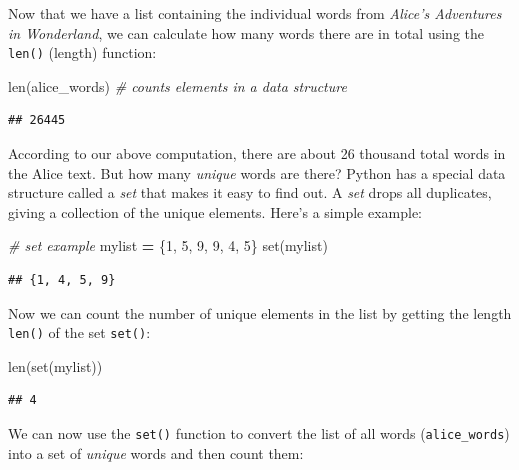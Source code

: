 \documentclass[
]{book}
\newenvironment{Shaded}{\begin{snugshade}}{\end{snugshade}}
\newcommand{\BuiltInTok}[1]{#1}
\newcommand{\CommentTok}[1]{\textcolor[rgb]{0.56,0.35,0.01}{\textit{#1}}}
\newcommand{\DecValTok}[1]{\textcolor[rgb]{0.00,0.00,0.81}{#1}}
\newcommand{\NormalTok}[1]{#1}
\newcommand{\OperatorTok}[1]{\textcolor[rgb]{0.81,0.36,0.00}{\textbf{#1}}}
\begin{document}
Now that we have a list containing the individual words from \emph{Alice's Adventures in Wonderland}, we can calculate how many words there are in total using the \texttt{len()} (length) function:

\begin{Shaded}
\begin{Highlighting}[]
\BuiltInTok{len}\NormalTok{(alice\_words) }\CommentTok{\# counts elements in a data structure}
\end{Highlighting}
\end{Shaded}

\begin{verbatim}
## 26445
\end{verbatim}

According to our above computation, there are about 26 thousand total words in the Alice text. But how many \emph{unique} words are there? Python has a special data structure called a \emph{set} that makes it easy to find out. A \emph{set} drops all duplicates, giving a collection of the unique elements. Here's a simple example:

\begin{Shaded}
\begin{Highlighting}[]
\CommentTok{\# set example}
\NormalTok{mylist }\OperatorTok{=}\NormalTok{ \{}\DecValTok{1}\NormalTok{, }\DecValTok{5}\NormalTok{, }\DecValTok{9}\NormalTok{, }\DecValTok{9}\NormalTok{, }\DecValTok{4}\NormalTok{, }\DecValTok{5}\NormalTok{\}}
\BuiltInTok{set}\NormalTok{(mylist)}
\end{Highlighting}
\end{Shaded}

\begin{verbatim}
## {1, 4, 5, 9}
\end{verbatim}

Now we can count the number of unique elements in the list by getting the length \texttt{len()} of the set \texttt{set()}:

\begin{Shaded}
\begin{Highlighting}[]
\BuiltInTok{len}\NormalTok{(}\BuiltInTok{set}\NormalTok{(mylist))}
\end{Highlighting}
\end{Shaded}

\begin{verbatim}
## 4
\end{verbatim}

We can now use the \texttt{set()} function to convert the list of all words (\texttt{alice\_words}) into a set of \emph{unique} words and then count them:
\end{document}
